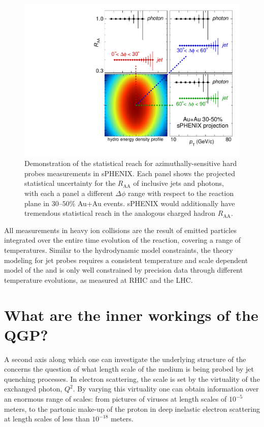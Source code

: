 \begin{figure}[t]
 \begin{center} %
    \includegraphics[width=0.8\linewidth]{figs/sPHENIX_MIE_AuAu_ReactionPlane_figure}
    \caption[Statistical reach of azimuthally-sensitive hard probes in
    sPHENIX]{Demonstration of the statistical reach for
      azimuthally-sensitive hard probes measurements in sPHENIX. Each
      panel shows the projected statistical uncertainty for the
      $R_\mathrm{AA}$ of inclusive jets and photons, with each a panel
      a different $\Delta\phi$ range with respect to the reaction
      plane in $30$--$50$\% Au+Au events. sPHENIX would additionally
      have tremendous statistical reach in the analogous charged
      hadron
      $R_\mathrm{AA}$. \label{fig:sPHENIX_AuAu_ReactionPlane_figure} }
    \end{center}
\end{figure}

All measurements in heavy ion collisions are the result of emitted
particles integrated over the entire time evolution of the reaction,
covering a range of temperatures.  Similar to the hydrodynamic model constraints, the
theory modeling for jet probes requires a consistent temperature and scale dependent
model of the \qgp and is only well constrained by precision data through
different temperature evolutions, as measured at RHIC and the LHC.


\section{What are the inner workings of the QGP?}
\label{Section:InnerWorkings}

A second axis along which one can investigate the underlying
structure of the \qgp concerns the question of what length scale of
the medium is being probed by jet quenching processes.  In
electron scattering, the scale is set by the virtuality of the
exchanged photon, $Q^{2}$. By varying this virtuality one can
obtain information over an enormous range of scales: from
pictures of viruses at length scales of $10^{-5}$ meters, to the
partonic make-up of the proton in deep inelastic electron scattering
at length scales of less than $10^{-18}$ meters. 

